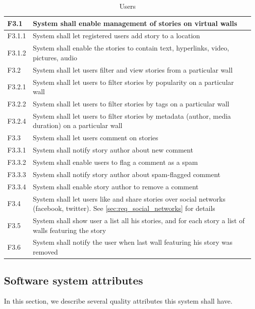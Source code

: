 \documentclass[11pt]{book}
\begin{document}
\begin{table}[H]
\centering
\begin{tabular}{ l  p{11cm} }
	F3.1 	& System shall enable management of stories on virtual walls 														\\ \hline
	F3.1.1 	& System shall let registered users add story to a location 														\\ \hline
	F3.1.2 	& System shall enable the stories to contain text, hyperlinks, video, pictures, audio 								\\ \hline
	F3.2 	& System shall let users filter and view stories from a particular wall 											\\ \hline
	F3.2.1 	& System shall let users to filter stories by popularity on a particular wall 										\\ \hline
	F3.2.2 	& System shall let users to filter stories by tags on a particular wall 											\\ \hline
	F3.2.4 	& System shall let users to filter stories by metadata (author, media duration) on a particular wall 				\\ \hline
	F3.3 	& System shall let users comment on stories 																		\\ \hline
	F3.3.1 	& System shall notify story author about new comment 																\\ \hline
	F3.3.2 	& System shall enable users to flag a comment as a spam 															\\ \hline
	F3.3.3 	& System shall notify story author about spam-flagged comment 														\\ \hline
	F3.3.4 	& System shall enable story author to remove a comment 																\\ \hline
	F3.4 	& System shall let users like and share stories over social networks (facebook, twitter). 
				See \ref{sec:req_social_networks} for details 																	\\ \hline
	F3.5 	& System shall show user a list all his stories, and for each story a list of walls featuring the story 			\\ \hline
	F3.6 	& System shall notify the user when last wall featuring his story was removed
	\end{tabular}
\label{tab:req_stories}
\caption{Users}
\end{table}

\subsection{Software system attributes}\label{sec:req_software_system_attributes}
In this section, we describe several quality attributes this system shall have.
\end{document}

